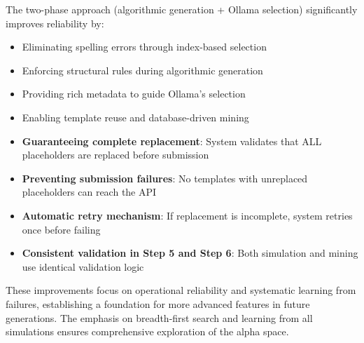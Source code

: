 The two-phase approach (algorithmic generation + Ollama selection) significantly improves reliability by:
\begin{itemize}
    \item Eliminating spelling errors through index-based selection
    \item Enforcing structural rules during algorithmic generation
    \item Providing rich metadata to guide Ollama's selection
    \item Enabling template reuse and database-driven mining
    \item \textbf{Guaranteeing complete replacement}: System validates that ALL placeholders are replaced before submission
    \item \textbf{Preventing submission failures}: No templates with unreplaced placeholders can reach the API
    \item \textbf{Automatic retry mechanism}: If replacement is incomplete, system retries once before failing
    \item \textbf{Consistent validation in Step 5 and Step 6}: Both simulation and mining use identical validation logic
\end{itemize}

These improvements focus on operational reliability and systematic learning from failures, establishing a foundation for more advanced features in future generations. The emphasis on breadth-first search and learning from all simulations ensures comprehensive exploration of the alpha space.
